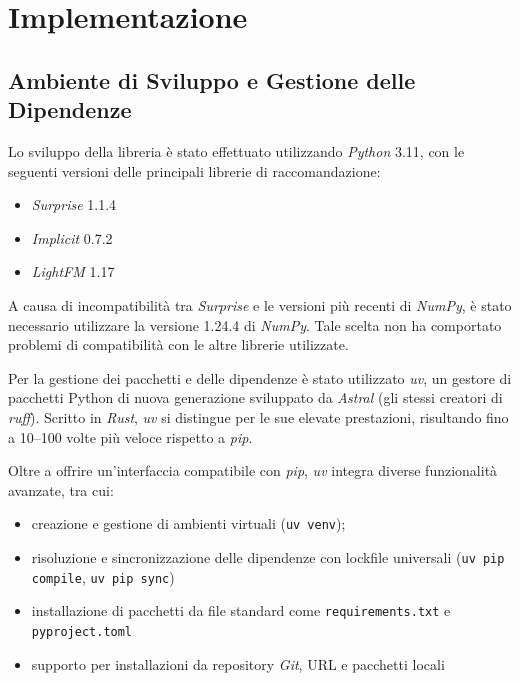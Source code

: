 \chapter{Implementazione}

\section{Ambiente di Sviluppo e Gestione delle Dipendenze}

Lo sviluppo della libreria è stato effettuato utilizzando \textit{Python} 3.11, con le seguenti versioni delle principali librerie di raccomandazione:

\begin{itemize}
  \item \textit{Surprise} 1.1.4
  \item \textit{Implicit} 0.7.2
  \item \textit{LightFM} 1.17
\end{itemize}

A causa di incompatibilità tra \textit{Surprise} e le versioni più recenti di \textit{NumPy}, è stato necessario utilizzare la versione 1.24.4 di \textit{NumPy}. Tale scelta non ha comportato problemi di compatibilità con le altre librerie utilizzate.

Per la gestione dei pacchetti e delle dipendenze è stato utilizzato \textit{uv}, un gestore di pacchetti Python di nuova generazione sviluppato da \textit{Astral} (gli stessi creatori di \textit{ruff}). Scritto in \textit{Rust}, \textit{uv} si distingue per le sue elevate prestazioni, risultando fino a 10--100 volte più veloce rispetto a \textit{pip}.

Oltre a offrire un'interfaccia compatibile con \textit{pip}, \textit{uv} integra diverse funzionalità avanzate, tra cui:

\begin{itemize}
  \item creazione e gestione di ambienti virtuali (\texttt{uv venv});
  \item risoluzione e sincronizzazione delle dipendenze con lockfile universali (\texttt{uv pip compile}, \texttt{uv pip sync})
  \item installazione di pacchetti da file standard come \texttt{requirements.txt} e \\ \texttt{pyproject.toml}
  \item supporto per installazioni da repository \textit{Git}, URL e pacchetti locali
\end{itemize}

